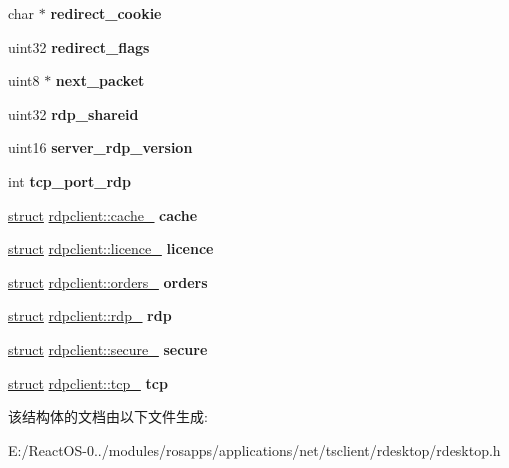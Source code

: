\begin{DoxyCompactItemize}
\item 
\mbox{\label{structrdpclient_a5225910b84950377249d0717e1958900}} 
char $\ast$ {\bfseries redirect\+\_\+cookie}
\item 
\mbox{\label{structrdpclient_a8818d219d4af35d2e0c2aaa3858e8d17}} 
uint32 {\bfseries redirect\+\_\+flags}
\item 
\mbox{\label{structrdpclient_af912d7a9bc13dcd09be697bb4081cd82}} 
uint8 $\ast$ {\bfseries next\+\_\+packet}
\item 
\mbox{\label{structrdpclient_ae18596391ee747f36ed62e92af51a69a}} 
uint32 {\bfseries rdp\+\_\+shareid}
\item 
\mbox{\label{structrdpclient_a5ebcd46661e3db9afe4a2fca2957dfbd}} 
uint16 {\bfseries server\+\_\+rdp\+\_\+version}
\item 
\mbox{\label{structrdpclient_a0be5ada80528218504907d5b51487580}} 
int {\bfseries tcp\+\_\+port\+\_\+rdp}
\item 
\mbox{\label{structrdpclient_ae4698d3e3fa7456d1076dac36d8a7563}} 
\hyperlink{interfacestruct}{struct} \hyperlink{structrdpclient_1_1cache__}{rdpclient\+::cache\+\_\+} {\bfseries cache}
\item 
\mbox{\label{structrdpclient_a3c5df7b1e00d5fcb5cabaa529f24ff3b}} 
\hyperlink{interfacestruct}{struct} \hyperlink{structrdpclient_1_1licence__}{rdpclient\+::licence\+\_\+} {\bfseries licence}
\item 
\mbox{\label{structrdpclient_aeef1a9c16f06cea6c1ba65f9630baa2f}} 
\hyperlink{interfacestruct}{struct} \hyperlink{structrdpclient_1_1orders__}{rdpclient\+::orders\+\_\+} {\bfseries orders}
\item 
\mbox{\label{structrdpclient_a1ba97ab470d15bc1a1e108adb1434d54}} 
\hyperlink{interfacestruct}{struct} \hyperlink{structrdpclient_1_1rdp__}{rdpclient\+::rdp\+\_\+} {\bfseries rdp}
\item 
\mbox{\label{structrdpclient_a1ea26942137565e0cdb6ea629f4a0cff}} 
\hyperlink{interfacestruct}{struct} \hyperlink{structrdpclient_1_1secure__}{rdpclient\+::secure\+\_\+} {\bfseries secure}
\item 
\mbox{\label{structrdpclient_a035fca9d2d89a3b9def5bc628b2f4671}} 
\hyperlink{interfacestruct}{struct} \hyperlink{structrdpclient_1_1tcp__}{rdpclient\+::tcp\+\_\+} {\bfseries tcp}
\end{DoxyCompactItemize}


该结构体的文档由以下文件生成\+:\begin{DoxyCompactItemize}
\item 
E\+:/\+React\+O\+S-\/0../modules/rosapps/applications/net/tsclient/rdesktop/rdesktop.\+h\end{DoxyCompactItemize}
